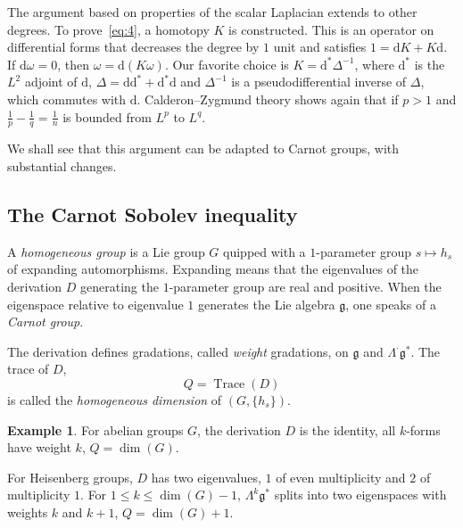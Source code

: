 \documentclass[11pt]{article}
\theoremstyle{definition}
\newtheorem{exem}[theo]{Example}
\numberwithin{equation}{section}
\numberwithin{figure}{section}
\numberwithin{table}{section}
\DeclareMathOperator{\Trace}{Trace}
\newcommand{\dd}{\mathrm{d}}
\newcommand{\dK}{\dd K}
\begin{document}
The argument based on properties of the scalar Laplacian extends to other degrees. To prove~\eqref{eq:4}, a homotopy $K$ is constructed. This is an operator on differential forms that decreases the degree by $1$ unit and satisfies $1=\dK+K\dd$. If $\dd\omega=0$, then $\omega=\dd(K\omega)$. Our favorite choice is $K=\dd^*\Delta^{-1}$, where $\dd^*$ is the $L^2$ adjoint of $\dd$, $\Delta= \dd\dd^*+\dd^*\dd$ and $\Delta^{-1}$ is a pseudodifferential inverse of $\Delta$, which commutes with $\dd$. Calderon--Zygmund theory shows again that if $p>1$ and $\frac{1}{p}-\frac{1}{q}=\frac{1}{n}$ is bounded from $L^p$ to $L^q$.

We shall see that this argument can be adapted to Carnot groups, with substantial changes.

\subsection{The Carnot Sobolev inequality}

A \emph{homogeneous group} is a Lie group $G$ quipped with a $1$-parameter group $s\mapsto h_s$ of expanding automorphisms. Expanding means that the eigenvalues of the derivation $D$ generating the $1$-parameter group are real and positive. When the eigenspace relative to eigenvalue $1$ generates the Lie algebra $\mathfrak{g}$, one speaks of a \emph{Carnot group}.

The derivation defines gradations, called \emph{weight} gradations, on $\mathfrak{g}$ and $\Lambda^\cdot\mathfrak{g}^*$. The trace of $D$,
\begin{equation*}
Q=\Trace(D)
\end{equation*}
is called the \emph{homogeneous dimension} of $(G,\{h_s\})$.

\begin{exem}
For abelian groups $G$, the derivation $D$ is the identity, all $k$-forms have weight $k$, $Q=\dim(G)$.

For Heisenberg groups, $D$ has two eigenvalues, $1$ of even multiplicity and $2$ of multiplicity $1$. For $1\leq k\leq \dim(G)-1$, $\Lambda^k\mathfrak{g}^*$ splits into two eigenspaces with weights $k$ and $k+1$, $Q=\dim(G)+1$.
\end{exem}
\end{document}
